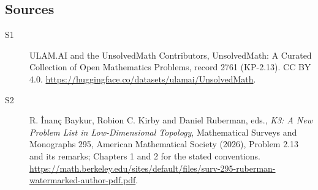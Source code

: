 \documentclass[11pt]{article}
\begin{document}
\subsection{Sources}
\begin{description}
\item[\hypertarget{source:2761:1}{S1}] ULAM.AI and the UnsolvedMath Contributors, UnsolvedMath: A Curated Collection of Open Mathematics Problems, record 2761 (KP-2.13). CC BY 4.0. \url{https://huggingface.co/datasets/ulamai/UnsolvedMath}.
\item[\hypertarget{source:2761:2}{S2}] R. İnanç Baykur, Robion C. Kirby and Daniel Ruberman, eds., \emph{K3: A New Problem List in Low-Dimensional Topology}, Mathematical Surveys and Monographs 295, American Mathematical Society (2026), Problem 2.13 and its remarks; Chapters 1 and 2 for the stated conventions. \url{https://math.berkeley.edu/sites/default/files/surv-295-ruberman-watermarked-author-pdf.pdf}.
\end{description}
\label{end:2761}
\end{document}
